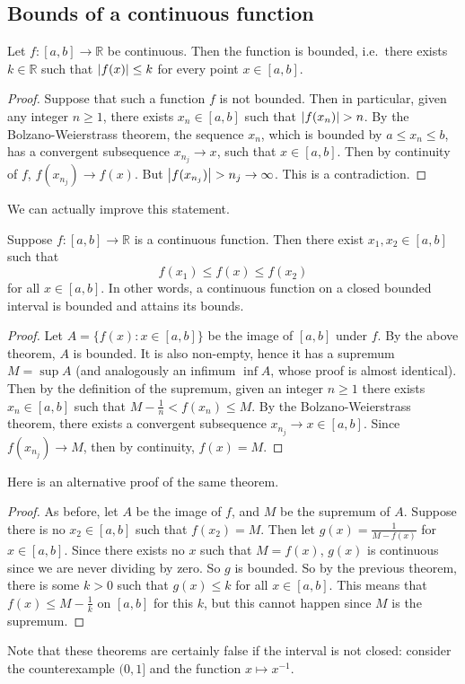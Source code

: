 \subsection{Bounds of a continuous function}
\begin{theorem}
	Let \(f \colon [a, b] \to \mathbb R\) be continuous.
	Then the function is bounded, i.e.\ there exists \(k \in \mathbb R\) such that \(\abs{f(x)} \leq k\) for every point \(x \in [a, b]\).
\end{theorem}
\begin{proof}
	Suppose that such a function \(f\) is not bounded.
	Then in particular, given any integer \(n \geq 1\), there exists \(x_n \in [a, b]\) such that \(\abs{f(x_n)} > n\).
	By the Bolzano-Weierstrass theorem, the sequence \(x_n\), which is bounded by \(a \leq x_n \leq b\), has a convergent subsequence \(x_{n_j} \to x\), such that \(x \in [a, b]\).
	Then by continuity of \(f\), \(f(x_{n_j}) \to f(x)\).
	But \(\abs{f(x_{n_j})} > n_j \to \infty\).
	This is a contradiction.
\end{proof}
We can actually improve this statement.
\begin{theorem}
	Suppose \(f \colon [a, b] \to \mathbb R\) is a continuous function.
	Then there exist \(x_1, x_2 \in [a, b]\) such that
	\[
		f(x_1) \leq f(x) \leq f(x_2)
	\]
	for all \(x \in [a, b]\).
	In other words, a continuous function on a closed bounded interval is bounded and attains its bounds.
\end{theorem}
\begin{proof}
	Let \(A = \{ f(x) \colon x \in [a, b] \}\) be the image of \([a, b]\) under \(f\).
	By the above theorem, \(A\) is bounded.
	It is also non-empty, hence it has a supremum \(M = \sup A\) (and analogously an infimum \(\inf A\), whose proof is almost identical).
	Then by the definition of the supremum, given an integer \(n \geq 1\) there exists \(x_n \in [a, b]\) such that \(M - \frac{1}{n} < f(x_n) \leq M\).
	By the Bolzano-Weierstrass theorem, there exists a convergent subsequence \(x_{n_j} \to x \in [a, b]\).
	Since \(f(x_{n_j}) \to M\), then by continuity, \(f(x) = M\).
\end{proof}
Here is an alternative proof of the same theorem.
\begin{proof}
	As before, let \(A\) be the image of \(f\), and \(M\) be the supremum of \(A\).
	Suppose there is no \(x_2 \in [a, b]\) such that \(f(x_2) = M\).
	Then let \(g(x) = \frac{1}{M - f(x)}\) for \(x \in [a, b]\).
	Since there exists no \(x\) such that \(M = f(x)\), \(g(x)\) is continuous since we are never dividing by zero.
	So \(g\) is bounded.
	So by the previous theorem, there is some \(k > 0\) such that \(g(x) \leq k\) for all \(x \in [a, b]\).
	This means that \(f(x) \leq M - \frac{1}{k}\) on \([a, b]\) for this \(k\), but this cannot happen since \(M\) is the supremum.
\end{proof}
Note that these theorems are certainly false if the interval is not closed: consider the counterexample \((0, 1]\) and the function \(x \mapsto x^{-1}\).


